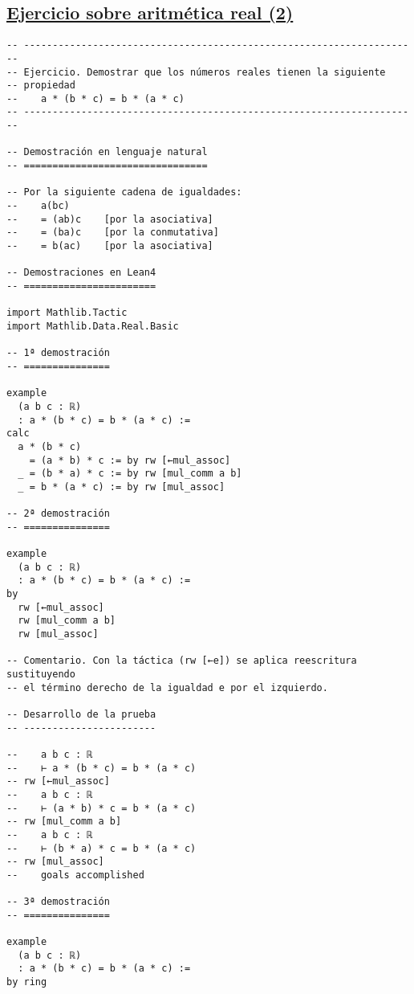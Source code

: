 \subsection{\href{./src/Basicos/Ejercicio\_sobre\_aritmetica\_real\_2.lean}{Ejercicio sobre aritmética real (2)}}
\label{sec:org91c5f45}
\begin{verbatim}
-- ---------------------------------------------------------------------
-- Ejercicio. Demostrar que los números reales tienen la siguiente
-- propiedad
--    a * (b * c) = b * (a * c)
-- ---------------------------------------------------------------------

-- Demostración en lenguaje natural
-- ================================

-- Por la siguiente cadena de igualdades:
--    a(bc)
--    = (ab)c    [por la asociativa]
--    = (ba)c    [por la conmutativa]
--    = b(ac)    [por la asociativa]

-- Demostraciones en Lean4
-- =======================

import Mathlib.Tactic
import Mathlib.Data.Real.Basic

-- 1ª demostración
-- ===============

example
  (a b c : ℝ)
  : a * (b * c) = b * (a * c) :=
calc
  a * (b * c)
    = (a * b) * c := by rw [←mul_assoc]
  _ = (b * a) * c := by rw [mul_comm a b]
  _ = b * (a * c) := by rw [mul_assoc]

-- 2ª demostración
-- ===============

example
  (a b c : ℝ)
  : a * (b * c) = b * (a * c) :=
by
  rw [←mul_assoc]
  rw [mul_comm a b]
  rw [mul_assoc]

-- Comentario. Con la táctica (rw [←e]) se aplica reescritura sustituyendo
-- el término derecho de la igualdad e por el izquierdo.

-- Desarrollo de la prueba
-- -----------------------

--    a b c : ℝ
--    ⊢ a * (b * c) = b * (a * c)
-- rw [←mul_assoc]
--    a b c : ℝ
--    ⊢ (a * b) * c = b * (a * c)
-- rw [mul_comm a b]
--    a b c : ℝ
--    ⊢ (b * a) * c = b * (a * c)
-- rw [mul_assoc]
--    goals accomplished

-- 3ª demostración
-- ===============

example
  (a b c : ℝ)
  : a * (b * c) = b * (a * c) :=
by ring
\end{verbatim}


